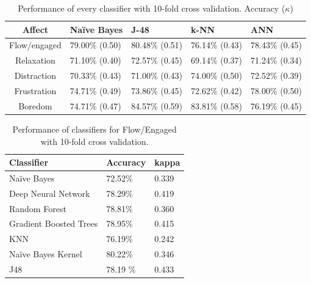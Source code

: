 \documentclass[a4paper,twoside]{article}
\begin{document}
\begin{table}[!t]
\centering
\caption{Performance of every classifier with 10-fold cross validation. Accuracy ($\kappa$) }
\label{tab_performance}
    \begin{tabular}{ | c | l | l | l | l | }
    \hline
    Affect          & Na\"ive Bayes           & J-48                & k-NN              & ANN \\
    \hline
    Flow/engaged    & 79.00\% (0.50) & 80.48\% (0.51) & 76.14\% (0.43) & 78.43\% (0.45) \\
    \hline
    Relaxation      & 71.10\% (0.40) & 72.57\% (0.45) & 69.14\% (0.37) & 71.24\% (0.34)\\
    \hline
    Distraction     & 70.33\% (0.43) & 71.00\% (0.43) & 74.00\% (0.50) & 72.52\% (0.39)\\
    \hline
    Frustration     & 74.71\% (0.49) & 73.86\% (0.45) & 72.62\% (0.42) & 78.00\% (0.50)\\
    \hline
    Boredom         & 74.71\% (0.47) & 84.57\% (0.59) & 83.81\% (0.58) & 76.19\% (0.45)\\
    \hline
    \end{tabular}
\end{table}



\begin{table}[!t]
\centering
\caption{Performance of classifiers for Flow/Engaged  with 10-fold cross validation. }
\label{tab_performance}
    \begin{tabular}{ | l | l | l | }
    \hline
    Classifier   &  Accuracy            & kappa                 \\
    \hline
    Na\"ive Bayes     & 72.52\%  & 0.339  \\
    \hline
    Deep Neural Network     & 78.29\%  & 0.419  \\
    \hline
    Random Forest      & 78.81\%  & 0.360  \\
    \hline
    Gradient Boosted Trees     & 78.95\%  & 0.415  \\
    \hline
    KNN      & 76.19\%  & 0.242  \\
    \hline
    Na\"ive Bayes Kernel     & 80.22\%  & 0.346 \\
    \hline
    J48     & 78.19 \%  & 0.433  \\
    \hline
  
    \end{tabular}
\end{table}
\end{document}
